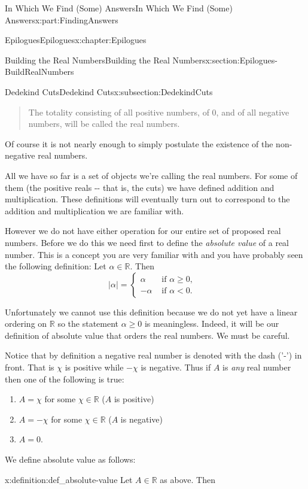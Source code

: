 \documentclass[oneside,10pt,]{book}
\numberwithin{equation}{section}
\newcommand{\abs}[1]{\left|#1\right|}
\newcommand{\RR}{\mathbb {R}}
\newcommand{\lt}{<}
\newcommand{\amp}{&}
\begin{document}
\begin{partptx}{In Which We Find (Some) Answers}{}{In Which We Find (Some) Answers}{}{}{x:part:FindingAnswers}
\begin{chapterptx}{Epilogues}{}{Epilogues}{}{}{x:chapter:Epilogues}
\begin{sectionptx}{Building the Real Numbers}{}{Building the Real Numbers}{}{}{x:section:Epilogues-BuildRealNumbers}
\begin{subsectionptx}{Dedekind Cuts}{}{Dedekind Cuts}{}{}{x:subsection:DedekindCuts}
\begin{quote}
\par
The totality consisting of all positive numbers, of \(0\), and of all negative numbers, will be called the real numbers.%
\end{quote}
Of course it is not nearly enough to simply postulate the existence of the non-negative real numbers.%
\par
All we have so far is a set of objects we're calling the real numbers.  For some of them (the positive reals -{}-{} that is, the cuts) we have defined addition and multiplication. These definitions will eventually turn out to correspond to the addition and multiplication we are familiar with.%
\par
However we do not have either operation for our entire set of proposed real numbers. Before we do this we need first to define the \emph{absolute value} of a real number. This is a concept you are very familiar with and you have probably seen the following definition: Let \(\alpha\in\RR\). Then%
\begin{equation*}
\abs{\alpha} = \begin{cases}\alpha\amp  \text{ if \(\alpha\ge0,\) } \\ -\alpha\amp  \text{ if \(\alpha\lt 0.\) } \end{cases}
\end{equation*}
%
\par
Unfortunately we cannot use this definition because we do not yet have a linear ordering on \(\RR\) so the statement \(\alpha\ge0\) is meaningless. Indeed, it will be our definition of absolute value that orders the real numbers. We must be careful.%
\par
Notice that by definition a negative real number is denoted with the dash ('-') in front. That is \(\chi\) is positive while \(-\chi\) is negative. Thus if \(A\) is \emph{any} real number then one of the following is true:%
\begin{enumerate}
\item{}\(A=\chi\) for some \(\chi\in\RR\) (\(A\) is positive)%
\item{}\(A=-\chi\) for some \(\chi\in\RR\) (\(A\) is negative)%
\item{}\(A=0\).%
\end{enumerate}
%
\par
We define absolute value as follows:%
\begin{definition}{}{x:definition:def_absolute-value}%
 Let \(A\in\RR\) as above. Then%
\begin{equation*}

\end{equation*}
\end{definition}
\end{subsectionptx}
\end{sectionptx}
\end{chapterptx}
\end{partptx}
\end{document}
